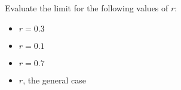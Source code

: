 \documentclass{ximera}
\begin{document}
\begin{question}
\begin{onlineOnly}
\begin{sageCell}
\end{sageCell}
\end{onlineOnly}

\begin{multipleChoice}
\choice{$\infty$}
\choice{$\pi$}
\end{multipleChoice}

Evaluate the limit for the following values of $r$:
\begin{itemize}
\item $r = 0.3$
\begin{multipleChoice}
\end{multipleChoice}
\item $r = 0.1$
\begin{multipleChoice}
\end{multipleChoice}
\item $r = 0.7$
\begin{multipleChoice}
\end{multipleChoice}
\item $r$, the general case
\begin{multipleChoice}
\end{multipleChoice}
\end{itemize}
\end{question}
\end{document}
